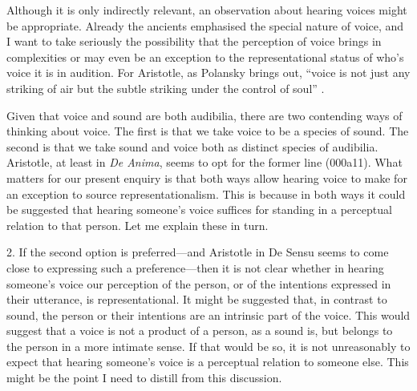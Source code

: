 \documentclass[sloppy, journal, git, bytitle, dodraft]{humapap}
\begin{document}
% 
% 

\sect Although it is only indirectly relevant, an observation about hearing voices might be appropriate. Already the ancients emphasised the special nature of voice, and I want to take seriously the possibility that the perception of voice brings in complexities or may even be an exception to the representational status of who's voice it is in audition. For Aristotle, as Polansky brings out, ``voice is not just any striking of air but the subtle striking under the control of soul'' \autocite[p. 300]{polansky2007aa}. 

Given that voice and sound are both audibilia, there are two contending ways of thinking about voice. The first is that we take voice to be a species of sound. The second is that we take sound and voice both as distinct species of audibilia. Aristotle, at least in \emph{De Anima}, seems to opt for the former line (000a11). What matters for our present enquiry is that both ways allow hearing voice to make for an exception to source representationalism. This is because in both ways it could be suggested that hearing someone's voice suffices for standing in a perceptual relation to that person. Let me explain these in turn.

2. If the second option is preferred---and Aristotle in De Sensu seems to come close to expressing such a preference---then it is not clear whether in hearing someone's voice our perception of the person, or of the intentions expressed in their utterance, is representational. It might be suggested that, in contrast to sound, the person or their intentions are an intrinsic part of the voice. This would suggest that a voice is not a product of a person, as a sound is, but belongs to the person in a more intimate sense. If that would be so, it is not unreasonably to expect that hearing someone's voice is a perceptual relation to someone else. This might be the point I need to distill from this discussion. 
\end{document}

